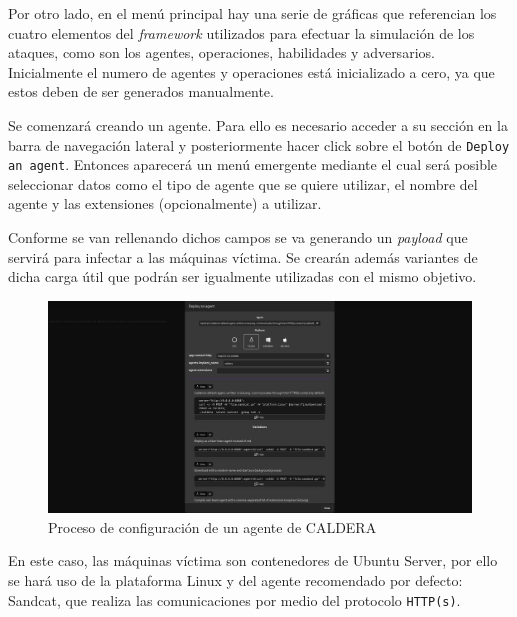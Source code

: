 Por otro lado, en el menú principal hay una serie de gráficas que referencian los cuatro elementos del \textit{framework} utilizados para efectuar la simulación de los ataques, como son los agentes, operaciones, habilidades y adversarios. Inicialmente el numero de agentes y operaciones está inicializado a cero, ya que estos deben de ser generados manualmente. 

Se comenzará creando un agente. Para ello es necesario acceder a su sección en la barra de navegación lateral y posteriormente hacer click sobre el botón de \texttt{Deploy an agent}. Entonces aparecerá un menú emergente mediante el cual será posible seleccionar datos como el tipo de agente que se quiere utilizar, el nombre del agente y las extensiones (opcionalmente) a utilizar. 

\newpage

Conforme se van rellenando dichos campos se va generando un \textit{payload} que servirá para infectar a las máquinas víctima. Se crearán además variantes de dicha carga útil que podrán ser igualmente utilizadas con el mismo objetivo.


\begin{figure}[H]
    \centering
    \includegraphics[width=1\linewidth]{imagenes/caldera-agent-v2.png}
    \caption{Proceso de configuración de un agente de \gls{CALDERA}}
    \label{fig:caldera-agents}
\end{figure}

En este caso, las máquinas víctima son contenedores de Ubuntu Server, por ello se hará uso de la plataforma Linux y del agente recomendado por defecto: Sandcat, que realiza las comunicaciones por medio del protocolo \texttt{\gls{HTTP}(s)}.

